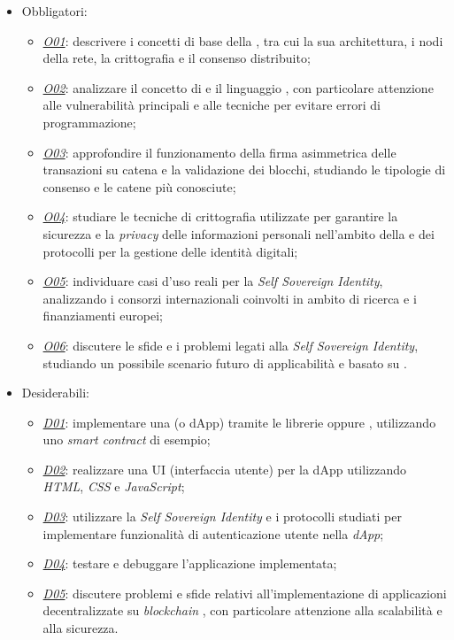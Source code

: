 \begin{itemize}

    \item Obbligatori:
        \begin{itemize}
            \item \underline{\textit{O01}}: descrivere i concetti di base della , tra cui la sua architettura, i nodi della rete, la crittografia e il consenso distribuito;
            \item \underline{\textit{O02}}: analizzare il concetto di  e il linguaggio , con particolare attenzione alle vulnerabilità principali e alle tecniche per evitare errori di programmazione;
            \item \underline{\textit{O03}}: approfondire il funzionamento della firma asimmetrica delle transazioni su catena e la validazione dei blocchi, studiando le tipologie di consenso e le catene più conosciute;
            \item \underline{\textit{O04}}: studiare le tecniche di crittografia utilizzate per garantire la sicurezza e la \textit{privacy} delle informazioni personali nell'ambito della  e dei protocolli per la gestione delle identità digitali;
            \item \underline{\textit{O05}}: individuare casi d'uso reali per la \textit{Self Sovereign Identity}, analizzando i consorzi internazionali coinvolti in ambito di ricerca e i finanziamenti europei;
            \item \underline{\textit{O06}}: discutere le sfide e i problemi legati alla \textit{Self Sovereign Identity}, studiando un possibile scenario futuro di applicabilità e basato su .
        \end{itemize}

    \item Desiderabili:
        \begin{itemize}
            \item \underline{\textit{D01}}: implementare una  (o dApp) tramite le librerie  oppure , utilizzando uno \textit{smart contract} di esempio;
            \item \underline{\textit{D02}}: realizzare una UI (interfaccia utente) per la dApp utilizzando \textit{HTML}, \textit{CSS} e \textit{JavaScript};
            \item \underline{\textit{D03}}: utilizzare la \textit{Self Sovereign Identity} e i protocolli studiati per implementare funzionalità di autenticazione utente nella \textit{dApp};
            \item \underline{\textit{D04}}: testare e debuggare l'applicazione implementata;
            \item \underline{\textit{D05}}: discutere problemi e sfide relativi all'implementazione di applicazioni decentralizzate su \textit{blockchain} , con particolare attenzione alla scalabilità e alla sicurezza.
        \end{itemize}


\end{itemize}
